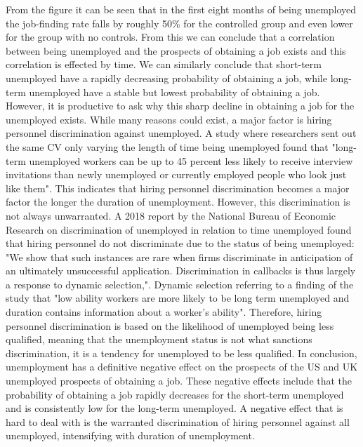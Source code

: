 From the figure it can be seen that in the first eight months of being unemployed the job-finding rate falls by roughly 50\% for the controlled group and even lower for the group with no controls.
From this we can conclude that a correlation between being unemployed and the prospects of obtaining a job exists and this correlation is effected by time.
We can similarly conclude that short-term unemployed have a rapidly decreasing probability of obtaining a job, while long-term unemployed have a stable but lowest probability of obtaining a job. 
However, it is productive to ask why this sharp decline in obtaining a job for the unemployed exists.
While many reasons could exist, a major factor is hiring personnel discrimination against unemployed.
A study where researchers sent out the same CV only varying the length of time being unemployed found that "long-term unemployed workers can be up to 45 percent less likely to receive interview invitations than newly unemployed or currently employed people who look just like them".\cite{Unemployment_effect_unemployed}
This indicates that hiring personnel discrimination becomes a major factor the longer the duration of unemployment.
However, this discrimination is not always unwarranted.
A 2018 report by the National Bureau of Economic Research on discrimination of unemployed in relation to time unemployed found that hiring personnel do not discriminate due to the status of being unemployed:\cite{Unemployment_Discrimination}
"We show that such instances are rare when firms discriminate in anticipation of an ultimately unsuccessful application. Discrimination in callbacks is thus largely a response to dynamic selection,".
Dynamic selection referring to a finding of the study that "low ability workers are more likely to be long term unemployed and duration contains information about a worker’s ability".
Therefore, hiring personnel discrimination is based on the likelihood of unemployed being less qualified, meaning that the unemployment status is not what sanctions discrimination, it is a tendency for unemployed to be less qualified.
In conclusion, unemployment has a definitive negative effect on the prospects of the US and UK unemployed prospects of obtaining a job.
These negative effects include that the probability of obtaining a job rapidly decreases for the short-term unemployed and is consistently low for the long-term unemployed.
A negative effect that is hard to deal with is the warranted discrimination of hiring personnel against all unemployed, intensifying with duration of unemployment. \\

